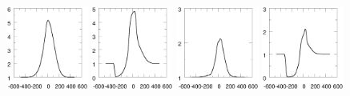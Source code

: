 \documentclass{article}
\begin{document}
\begin{figure}
    \includegraphics[width=0.24\textwidth]{profHa3wind456090}
    \includegraphics[width=0.24\textwidth]{profHa3wind453060}
    \includegraphics[width=0.24\textwidth]{profHb3wind456090}    
    \includegraphics[width=0.24\textwidth]{profHb3wind453060}
    

\end{figure}
\end{document}
